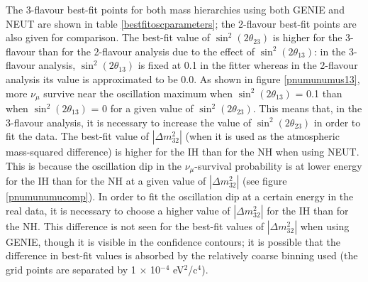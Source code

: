 The 3-flavour best-fit points for both mass hierarchies using both GENIE and NEUT are shown in table \ref{bestfitoscparameters}; the 
2-flavour best-fit points \cite{OurRun1and2Analysis2F} are also given for comparison. The best-fit value of $\sin^{2}(2 \theta_{23})$ is 
higher for the 3-flavour than for the 2-flavour analysis due to the effect of $\sin^{2}(2 \theta_{13})$: in the 3-flavour analysis,
$\sin^{2}(2 \theta_{13})$ is fixed at 0.1 in the fitter whereas in the 2-flavour analysis its value is approximated to be 0.0. As shown
in figure \ref{pnumunumus13}, more $\nu_{\mu}$ survive near the oscillation maximum when $\sin^{2}(2 \theta_{13})$ = 0.1 than when 
$\sin^{2}(2 \theta_{13})$ = 0 for a given value of $\sin^{2}(2 \theta_{23})$. This means that, in the 3-flavour analysis, it is necessary 
to increase the value of $\sin^{2}(2 \theta_{23})$ in order to fit the data. The best-fit value of $|\Delta m_{32}^{2}|$ (when it is used as 
the atmospheric mass-squared difference) is higher for the IH than for the NH when using NEUT. This is because the oscillation dip in the 
$\nu_{\mu}$-survival probability is at lower energy for the IH than for the NH at a given value of $|\Delta m_{32}^{2}|$ (see figure 
\ref{pnumunumucomp}). In order to fit the oscillation dip at a certain energy in the real data, it is necessary to choose a higher value 
of $|\Delta m_{32}^{2}|$ for the IH than for the NH. This difference is not seen for the best-fit values of $|\Delta m_{32}^{2}|$ when 
using GENIE, though it is visible in the confidence contours; it is possible that the difference in best-fit values is absorbed by the 
relatively coarse binning used (the grid points are separated by 1 $\times$ 10$^{-4}$ eV$^{2}$/c$^{4}$).

